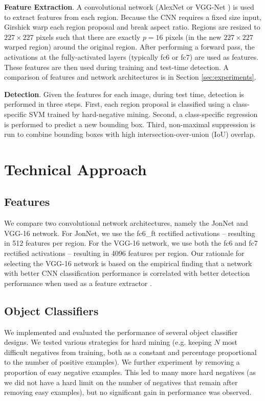 \documentclass[10pt,twocolumn,letterpaper]{article}
\begin{document}
\textbf{Feature Extraction}. A convolutional network (\eg AlexNet \cite{krizhevsky2012imagenet} or VGG-Net \cite{simonyan2014very}) is used to extract features from each region. Because the CNN requires a fixed size input, Girshick \etal warp each region proposal and break aspect ratio. Regions are resized to $227 \times 227$ pixels such that there are exactly $p=16$ pixels (in the new $227 \times 227$ warped region) around the original region. After performing a forward pass, the activations at the fully-activated layers (typically fc6 or fc7) are used as features. These features are then used during training and test-time detection. A comparison of features and network architectures is in Section \ref{sec:experiments}.

\textbf{Detection}. Given the features for each image, during test time, detection is performed in three steps. First, each region proposal is classified using a class-specific SVM trained by hard-negative mining. Second, a class-specific regression is performed to predict a new bounding box. Third, non-maximal suppression is run to combine bounding boxes with high intersection-over-union (IoU) overlap.

\section{Technical Approach}\label{sec:technical_approach}

\subsection{Features}

We compare two convolutional network architectures, namely the JonNet and VGG-16 \cite{simonyan2014very} network. For JonNet, we use the fc6\_ft rectified activations -- resulting in 512 features per region. For the VGG-16 network, we use both the fc6 and fc7 rectified activations -- resulting in 4096 features per region. Our rationale for selecting the VGG-16 network is based on the empirical finding that a network with better CNN classification performance is correlated with better detection performance when used as a feature extractor \cite{girshick2015fast}.

\subsection{Object Classifiers}

We implemented and evaluated the performance of several object classifier designs. We tested various strategies for hard mining (e.g. keeping $N$ most difficult negatives from training, both as a constant and percentage proportional to the number of positive examples). We further experiment by removing a proportion of easy negative examples. This led to many more hard negatives (as we did not have a hard limit on the number of negatives that remain after removing easy examples), but no significant gain in performance was observed.
\end{document}
